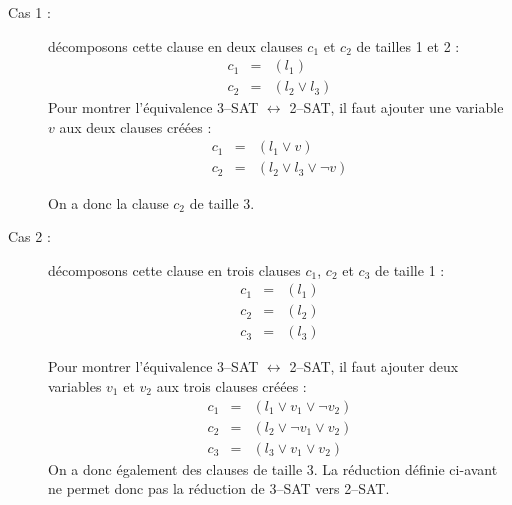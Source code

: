 \begin{description}
\item[Cas 1 :] décomposons cette clause en deux clauses $c_1$ et $c_2$ de tailles 1 et 2 :
\begin{eqnarray*}
c_1&=&(l_1) \\
c_2&=&(l_2 \vee l_3)
\end{eqnarray*}
Pour montrer l'équivalence 3--SAT $\leftrightarrow$ 2--SAT, il faut ajouter une variable $v$ aux deux clauses créées :
\begin{eqnarray*}
c_1&=&(l_1 \vee v) \\
c_2&=&(l_2 \vee l_3 \vee \neg v)
\end{eqnarray*}

On a donc la clause $c_2$ de taille 3.

\item[Cas 2 :] décomposons cette clause en trois clauses $c_1$, $c_2$ et $c_3$ de taille 1 :
\begin{eqnarray*}
c_1 & = & (l_1) \\
c_2 & = & (l_2) \\
c_3 & = & (l_3)
\end{eqnarray*}

Pour montrer l'équivalence 3--SAT $\leftrightarrow$ 2--SAT, il faut ajouter deux variables $v_1$ et $v_2$ aux trois clauses créées :
\begin{eqnarray*}
c_1 & = & (l_1 \vee v_1 \vee \neg v_2) \\
c_2 & = & (l_2 \vee \neg v_1 \vee v_2)\\
c_3 & = & (l_3 \vee v_1 \vee v_2)
\end{eqnarray*}
On a donc également des clauses de taille 3. La réduction définie ci-avant ne permet donc pas la réduction de 3--SAT vers 2--SAT.
\end{description}




